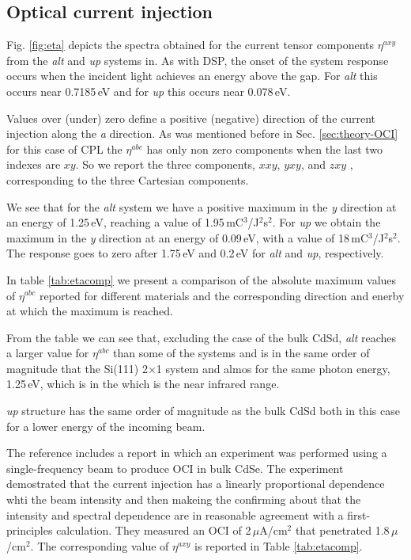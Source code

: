 \documentclass[pss]{wiley2sp} %
\begin{document}
\subsection{Optical current injection}\label{subsec:results-eta}

Fig. \ref{fig:eta} depicts the spectra obtained for the current tensor components $\eta^{axy}$ from the \emph{alt} and \emph{up} systems in. As with DSP, the onset of the system response occurs when the incident light achieves an energy above the gap. For \emph{alt} this occurs near 0.7185\,eV and for \emph{up} this occurs near 0.078\,eV.

Values over (under) zero define a positive (negative) direction of the current injection along the \emph{a} direction. As was mentioned before in Sec. \ref{sec:theory-OCI} for this case of CPL the $\eta^{abc}$ has only non zero components when the last two indexes are $xy$. So we report the three components, $xxy$, $yxy$, and $zxy$ , corresponding to the three Cartesian components.

We see that for the \emph{alt} system we have a positive maximum in the \emph{y} direction at an energy of 1.25\,eV, reaching a value of 1.95\,mC$^{3}$/J$^{2}$s$^{2}$. For \emph{up} we obtain the maximum in the \emph{y} direction at an energy of 0.09\,eV, with a value of 18\,mC$^{3}$/J$^{2}$s$^{2}$. The response goes to zero after 1.75\,eV and 0.2\,eV for \emph{alt} and \emph{up}, respectively.

In table \ref{tab:etacomp} we present a comparison of the absolute maximum values of $\eta^{abc}$ reported for different materials and the corresponding direction and enerby at which the maximum is reached. 

From the table we can see that, excluding the case of the bulk CdSd, \emph{alt} reaches a larger value for $\eta^{abc}$ than some of the systems and is in the same order of magnitude that the Si(111) 2$\times$1 system and almos for the same photon energy, 1.25\,eV, which is in the which is the near infrared range. 

\emph{up} structure has the same order of magnitude as the bulk CdSd both in this case for a lower energy of the incoming beam.\

The reference \cite{lamanAPL99} includes a report in which an experiment was performed using a single-frequency beam to produce OCI in bulk CdSe. The experiment demostrated that the current injection has a  linearly proportional dependence whti the beam intensity and then makeing the confirming about that the intensity and spectral dependence are in reasonable agreement with a first-principles calculation. They measured an OCI of 2\,$\mu$A/cm$^{2}$ that penetrated 1.8\,$\mu$/cm$^{2}$. The corresponding value of $\eta^{axy}$ is reported in Table \ref{tab:etacomp}.
\end{document}
